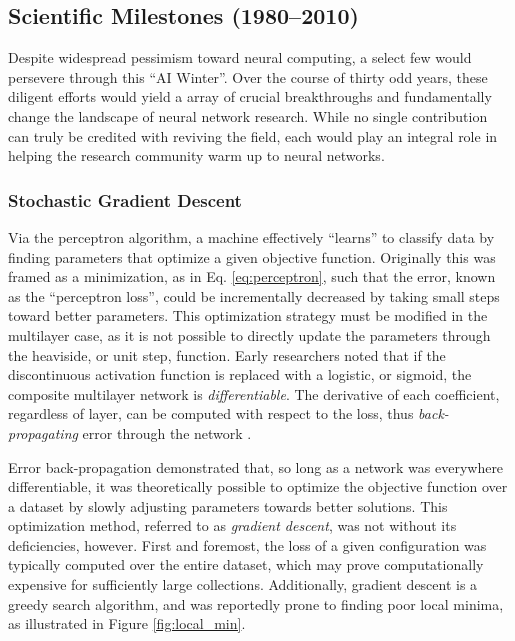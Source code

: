 \subsection{Scientific Milestones (1980--2010)}
\label{sec:advances}

Despite widespread pessimism toward neural computing, a select few would persevere through this ``AI Winter''.
Over the course of thirty odd years, these diligent efforts would yield a array of crucial breakthroughs and fundamentally change the landscape of neural network research.
While no single contribution can truly be credited with reviving the field, each would play an integral role in helping the research community warm up to neural networks.

\subsubsection{Stochastic Gradient Descent}
\label{subsec:sgd}

Via the perceptron algorithm, a machine effectively ``learns'' to classify data by finding parameters that optimize a given objective function.
Originally this was framed as a minimization, as in Eq. \ref{eq:perceptron}, such that the error, known as the ``perceptron loss'', could be incrementally decreased by taking small steps toward better parameters.
This optimization strategy must be modified in the multilayer case, as it is not possible to directly update the parameters through the heaviside, or unit step, function.
Early researchers noted that if the discontinuous activation function is replaced with a logistic, or sigmoid, the composite multilayer network is \emph{differentiable}.
The derivative of each coefficient, regardless of layer, can be computed with respect to the loss, thus \emph{back-propagating} error through the network \cite{Hinton1986}.

Error back-propagation demonstrated that, so long as a network was everywhere differentiable, it was theoretically possible to optimize the objective function over a dataset by slowly adjusting parameters towards better solutions.
This optimization method, referred to as \emph{gradient descent}, was not without its deficiencies, however.
First and foremost, the loss of a given configuration was typically computed over the entire dataset, which may prove computationally expensive for sufficiently large collections.
Additionally, gradient descent is a greedy search algorithm, and was reportedly prone to finding poor local minima, as illustrated in Figure \ref{fig:local_min}.

